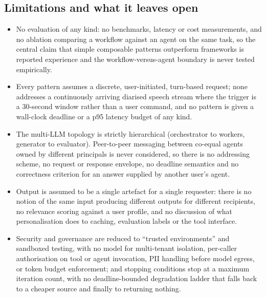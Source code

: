 \subsection{Limitations and what it leaves open}
\begin{itemize}[leftmargin=*, itemsep=1pt, topsep=2pt]
  \item No evaluation of any kind: no benchmarks, latency or cost measurements, and no ablation comparing a workflow against an agent on the same task, so the central claim that simple composable patterns outperform frameworks is reported experience and the workflow-versus-agent boundary is never tested empirically.
  \item Every pattern assumes a discrete, user-initiated, turn-based request; none addresses a continuously arriving diarised speech stream where the trigger is a 30-second window rather than a user command, and no pattern is given a wall-clock deadline or a p95 latency budget of any kind.
  \item The multi-LLM topology is strictly hierarchical (orchestrator to workers, generator to evaluator). Peer-to-peer messaging between co-equal agents owned by different principals is never considered, so there is no addressing scheme, no request or response envelope, no deadline semantics and no correctness criterion for an answer supplied by another user's agent.
  \item Output is assumed to be a single artefact for a single requester: there is no notion of the same input producing different outputs for different recipients, no relevance scoring against a user profile, and no discussion of what personalisation does to caching, evaluation labels or the tool interface.
  \item Security and governance are reduced to ``trusted environments'' and sandboxed testing, with no model for multi-tenant isolation, per-caller authorisation on tool or agent invocation, PII handling before model egress, or token budget enforcement; and stopping conditions stop at a maximum iteration count, with no deadline-bounded degradation ladder that falls back to a cheaper source and finally to returning nothing.
\end{itemize}
